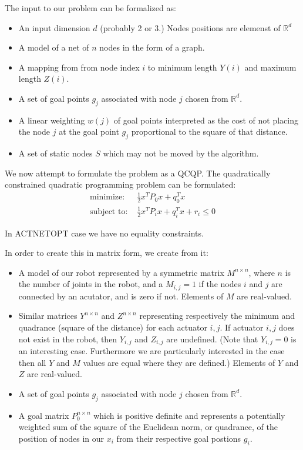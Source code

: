 \documentclass[11pt]{article}
\begin{document}
The input to our problem can be formalized as:
\begin{itemize}
 \item An input dimension $d$ (probably 2 or 3.) Nodes positions are elemenst of $\mathbb{R}^d$
 \item A model of a net of $n$ nodes in the form of a graph.
   \item A mapping from from node index $i$ to minimum length $Y(i)$ and maximum length $Z(i)$.
\item A set of goal points $g_j$ associated with node $j$ chosen from $\mathbb{R}^d$.
\item A linear weighting $w(j)$ of goal points interpreted as the cost of not placing the node $j$ at
  the goal point $g_j$ proportional to the square of that distance.
\item A set of static nodes $S$ which may not be moved by the algorithm.
\end{itemize}

We now attempt to formulate the problem as a QCQP.
The quadratically constrained quadratic programming problem can be formulated:
\begin{align*}
\text{minimize: }  & \frac{1}{2} x^TP_0x + q_0^Tx \\
\text{subject to: } & \frac{1}{2} x^TP_ix + q_i^Tx + r_i \leq 0
\end{align*}

In ACTNETOPT case we have no equality constraints.

In order to create this in matrix form, we create from it:
\begin{itemize}
\item A model of our robot represented by a symmetric matrix $M^{n \times n}$, where $n$ is the number of joints in the robot, and
  a $M_{i,j} = 1$ if the nodes $i$ and $j$ are connected by an acutator, and is zero if not. Elements of $M$ are real-valued.
\item Similar matrices $Y^{n \times n}$ and $Z^{n \times n}$ representing respectively the minimum and quadrance (square of the distance) for each actuator $i,j$.
  If actuator $i,j$ does not exist in the robot, then $Y_{i,j}$ and $Z_{i,j}$ are undefined. (Note that $Y_{i,j} = 0$ is an interesting case. Furthermore
  we are particularly interested in the case then all $Y$ and $M$ values are equal where they are defined.) Elements of $Y$ and $Z$ are real-valued.
\item A set of goal points $g_j$ associated with node $j$ chosen from $\mathbb{R}^d$.
\item A goal matrix $P_0^{n \times n}$ which is positive definite and represents a potentially weighted sum of the square of the Euclidean norm, or quadrance,
  of the position of nodes in our $x_i$ from their respective goal postions $g_i$.
\end{itemize}
\end{document}
